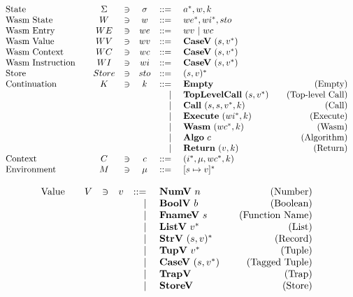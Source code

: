 \begin{align*}
\begin{array}{lcccrlr}
%
  \text{State}\quad& \Sigma &\ni& \sigma & ::=& ~ \seq a, w, k \\
%
  \text{Wasm State}\quad& W &\ni& w &::=& ~ \seq{we}, \seq{wi}, sto \\
%
  \text{Wasm Entry}\quad& WE &\ni& we &::=& ~ wv ~ | ~ wc \\
%
  \text{Wasm Value}\quad& WV &\ni& wv &::=& ~ \casev ~ (s, \seq v) \\
%
  \text{Wasm Context}\quad& WC &\ni& wc &::=& ~ \casev ~ (s, \seq v) \\
%
  \text{Wasm Instruction}\quad& WI &\ni& wi &::=& ~ \casev ~ (s, \seq v) \\
%
  \text{Store}\quad& Store &\ni& sto &::=& ~ \seq{(s, v)} \\
%
  \text{Continuation}\quad & K &\ni& k &::=& ~ \mt &\quad\text{(Empty)} \\
    &&&& | & ~ \toplevelcall ~ (s, \seq v) &\quad\text{(Top-level Call)} \\
    &&&& | & ~ \call ~ (s, s, \seq v, k) &\quad\text{(Call)} \\
    &&&& | & ~ \exe ~ (\seq{wi}, k) &\quad\text{(Execute)} \\
    &&&& | & ~ \wasm ~ (\seq{wc}, k) &\quad\text{(Wasm)} \\
    &&&& | & ~ \algo ~ c &\quad\text{(Algorithm)} \\
    &&&& | & ~ \ret ~ (v, k) &\quad\text{(Return)} \\
%
  \text{Context}\quad& C &\ni& c &::=& ~ (\seq i, \mu, \seq{wc}, k) \\
%
  \text{Environment}\quad& M &\ni& \mu &::=& ~ \seq{[s \mapsto v]} \\
\end{array}
\end{align*}

\newpage
\begin{align*}
\begin{array}{lcccrlr}
%
  \text{Value}\quad& V &\ni& v &::=& ~ \numv ~ n &\quad\text{(Number)} \\
    &&&& | & ~ \boolv ~ b &\quad\text{(Boolean)} \\
    &&&& | & ~ \fnamev ~ s &\quad\text{(Function Name)} \\
    &&&& | & ~ \listv ~ \seq v &\quad\text{(List)} \\
    &&&& | & ~ \strv ~ \seq{(s, v)} &\quad\text{(Record)} \\
    &&&& | & ~ \tupv ~ \seq v &\quad\text{(Tuple)} \\
    &&&& | & ~ \casev ~ (s, \seq v) &\quad\text{(Tagged Tuple)} \\
    &&&& | & ~ \trapv &\quad\text{(Trap)} \\
    &&&& | & ~ \storev &\quad\text{(Store)} \\
\end{array}
\end{align*}


